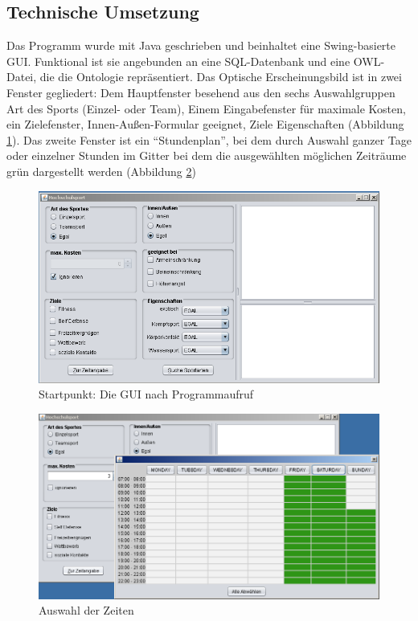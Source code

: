 \subsection{Technische Umsetzung}


Das Programm wurde mit Java geschrieben und beinhaltet eine Swing-basierte GUI. Funktional ist sie angebunden an eine SQL-Datenbank und eine OWL-Datei, die die Ontologie repräsentiert. Das Optische Erscheinungsbild ist in zwei Fenster gegliedert: Dem Hauptfenster besehend aus den sechs Auswahlgruppen Art des Sports (Einzel- oder Team), Einem Eingabefenster für maximale Kosten, ein Zielefenster, Innen-Außen-Formular geeignet, Ziele Eigenschaften (Abbildung \ref{GUI1}). Das zweite Fenster ist ein "`Stundenplan"', bei dem durch Auswahl ganzer Tage oder einzelner Stunden im Gitter bei dem die ausgewählten möglichen Zeiträume grün dargestellt werden (Abbildung \ref{GUI2})

\begin{figure}%
\includegraphics[width=150mm]{images/gui.png}%
\caption{Startpunkt: Die GUI nach Programmaufruf}%
\label{GUI1}%
\end{figure}

\begin{figure}%
\includegraphics[width=150mm]{images/guizeit.png}%
\caption{Auswahl der Zeiten}%
\label{GUI2}%
\end{figure}

